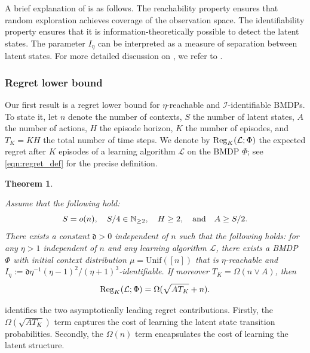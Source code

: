 \documentclass[11pt]{article}
\newcommand{\mf}[1]{\mathfrak{#1}}
\newcommand{\mcI}{\mathcal{I}}
\newcommand{\mcL}{\mathcal{L}}
\newcommand{\reg}{\textnormal{Reg}}
\newtheorem{theorem}{Theorem}[section]
\theoremstyle{definition}
\theoremstyle{definition}
\begin{document}
A brief explanation of  is as follows.
The reachability property ensures that random exploration achieves coverage of the observation space.
The identifiability property ensures that it is information-theoretically possible to detect the latent states.
The parameter $I_{\eta}$ can be interpreted as a measure of separation between latent states.
For more detailed discussion on , we refer to .

\subsubsection{Regret lower bound}

Our first result is a regret lower bound for $\eta$-reachable and $\mcI$-identifiable \glspl{BMDP}.
To state it, let $n$ denote the number of contexts, $S$ the number of latent states, $A$ the number of actions, $H$ the episode horizon, $K$ the number of episodes, and $T_K=KH$ the total number of time steps.
We denote by $\reg_K(\mcL;\Phi)$ the expected regret after $K$ episodes of a learning algorithm $\mcL$ on the \gls{BMDP} $\Phi$; see \eqref{eqn:regret_def} for the precise definition.

\begin{theorem}
	\label{thm:regret_lower_bound}

	Assume that the following hold:
	\begin{equation}
		\label{eqn:parameter_assumptions}
		S = o(n)
		,
		\quad
		S/4\in \mathbb{N}_{\geq 2}
		,
		\quad
		H\geq 2
		,
		\quad
		\textnormal{and}
		\quad
		A\geq S/2
		.
	\end{equation}
	There exists a constant $\mf{d}>0$ independent of $n$ such that the following holds:
	for any $\eta>1$ independent of $n$
	and any learning algorithm $\mcL$,
	there exists a \gls{BMDP} $\Phi$ with initial context distribution $\mu=\mathrm{Unif}([n])$
	that is
	$\eta$-reachable
	and $I_\eta := \mf{d}\eta^{-1}(\eta-1)^2/(\eta+1)^3$-identifiable.
	If moreover $T_K=\Omega(n\vee A)$, then
	\begin{equation}
		\label{eqn:regret_lower_bound}
		\reg_K(\mcL;\Phi)
		=
		\Omega(\sqrt{AT_K}+n)
		.
	\end{equation}
\end{theorem}

 identifies the two asymptotically leading regret contributions.
Firstly, the $\Omega(\sqrt{AT_K})$ term captures the cost of learning the latent state transition probabilities.
Secondly, the $\Omega(n)$ term encapsulates the cost of learning the latent structure.
\end{document}
